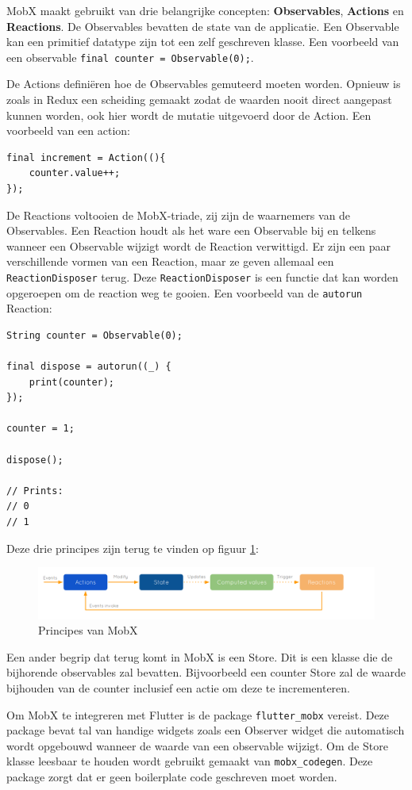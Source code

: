 MobX maakt gebruikt van drie belangrijke concepten: \textbf{Observables}, \textbf{Actions} en \textbf{Reactions}.
De Observables bevatten de state van de applicatie. Een Observable kan een primitief datatype zijn tot een zelf geschreven klasse. Een voorbeeld van een observable \verb|final counter = Observable(0);|.

De Actions definiëren hoe de Observables gemuteerd moeten worden. Opnieuw is zoals in Redux een scheiding gemaakt zodat de waarden nooit direct aangepast kunnen worden, ook hier wordt de mutatie uitgevoerd door de Action.
Een voorbeeld van een action:
\begin{verbatim}
final increment = Action((){
    counter.value++;
});    
\end{verbatim}

De Reactions voltooien de MobX-triade, zij zijn de waarnemers van de Observables. Een Reaction houdt als het ware een Observable bij en telkens wanneer een Observable wijzigt wordt de Reaction verwittigd. Er zijn een paar verschillende vormen van een Reaction, maar ze geven allemaal een \verb|ReactionDisposer| terug. Deze \verb|ReactionDisposer| is een functie dat kan worden opgeroepen om de reaction weg te gooien. Een voorbeeld van de \verb|autorun| Reaction:
\begin{verbatim}
String counter = Observable(0);

final dispose = autorun((_) {
    print(counter);
});

counter = 1;

dispose();

// Prints:
// 0
// 1
\end{verbatim}

Deze drie principes zijn terug te vinden op figuur \ref{fig:mobx-principles}:

\begin{figure}[H]
    \centering
    \includegraphics[width=\linewidth]{img/stand-van-zaken/mobx-principles.png}
    \caption{Principes van MobX \autocite{MobX2019}}
    \label{fig:mobx-principles}
\end{figure}

Een ander begrip dat terug komt in MobX is een Store. Dit is een klasse die de bijhorende observables zal bevatten. Bijvoorbeeld een counter Store zal de waarde bijhouden van de counter inclusief een actie om deze te incrementeren.

Om MobX te integreren met Flutter is de package \verb|flutter_mobx| vereist. Deze package bevat tal van handige widgets zoals een Observer widget die automatisch wordt opgebouwd wanneer de waarde van een observable wijzigt. 
Om de Store klasse leesbaar te houden wordt gebruikt gemaakt van \verb|mobx_codegen|. Deze package zorgt dat er geen boilerplate code geschreven moet worden. 
